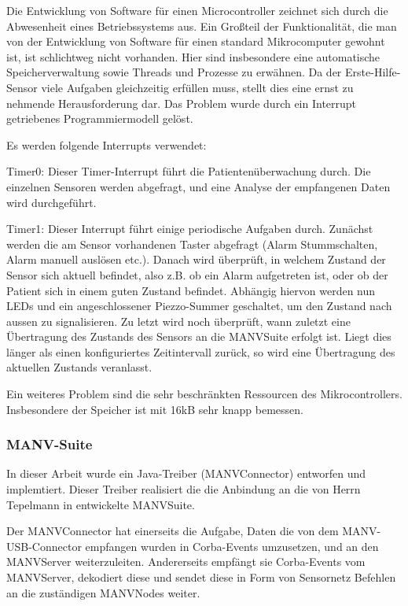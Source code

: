 Die Entwicklung von Software für einen Microcontroller zeichnet sich durch die Abwesenheit eines Betriebssystems 
aus. Ein Großteil der Funktionalität, die man von der Entwicklung von Software für einen standard Mikrocomputer 
gewohnt ist, ist schlichtweg nicht vorhanden. Hier sind insbesondere eine automatische Speicherverwaltung sowie
Threads und Prozesse zu erwähnen. Da der Erste-Hilfe-Sensor viele Aufgaben gleichzeitig erfüllen muss, stellt 
dies eine ernst zu nehmende Herausforderung dar. Das Problem wurde durch ein Interrupt getriebenes Programmiermodell
gelöst.

Es werden folgende Interrupts verwendet:

Timer0: Dieser Timer-Interrupt führt die Patientenüberwachung durch. Die einzelnen Sensoren werden abgefragt,
und eine Analyse der empfangenen Daten wird durchgeführt.

Timer1: Dieser Interrupt führt einige periodische Aufgaben durch. Zunächst werden die am Sensor vorhandenen
Taster abgefragt (Alarm Stummschalten, Alarm manuell auslösen etc.). Danach wird überprüft, in welchem Zustand
der Sensor sich aktuell befindet, also z.B. ob ein Alarm aufgetreten ist, oder ob der Patient sich in einem
guten Zustand befindet. Abhängig hiervon werden nun LEDs und ein angeschlossener Piezzo-Summer geschaltet,
um den Zustand nach aussen zu signalisieren. Zu letzt wird noch überprüft, wann zuletzt eine Übertragung
des Zustands des Sensors an die MANVSuite erfolgt ist. Liegt dies länger als einen konfiguriertes Zeitintervall
zurück, so wird eine Übertragung des aktuellen Zustands veranlasst.

Ein weiteres Problem sind die sehr beschränkten Ressourcen des Mikrocontrollers. Insbesondere der Speicher ist
mit 16kB sehr knapp bemessen. 

\subsubsection{MANV-Suite}
In dieser Arbeit wurde ein Java-Treiber (MANVConnector) entworfen und implemtiert. Dieser Treiber realisiert die die Anbindung an
die von Herrn Tepelmann in \cite{Jan} entwickelte MANVSuite.

Der MANVConnector hat einerseits die Aufgabe, Daten die von dem MANV-USB-Connector empfangen wurden in Corba-Events 
umzusetzen, und an den MANVServer weiterzuleiten. Andererseits empfängt sie Corba-Events vom MANVServer, dekodiert
diese und sendet diese in Form von Sensornetz Befehlen an die zuständigen MANVNodes weiter.

